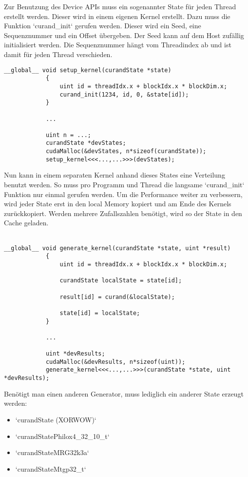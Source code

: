 			Zur Benutzung des Device \Glspl{API} muss ein sogenannter State für jeden \Gls{Thread} erstellt werden. Dieser wird in einem eigenen \Gls{Kernel} erstellt.
			Dazu muss die Funktion \li`curand_init` gerufen werden. Dieser wird ein Seed, eine Sequenznummer und ein Offset übergeben. Der Seed kann auf dem Host zufällig initialisiert werden. Die Sequenznummer hängt vom \Gls{Thread}index ab und ist damit für jeden \Gls{Thread} verschieden.
			\begin{lstlisting}[caption=cuRAND: Device API States]
			__global__ void setup_kernel(curandState *state)
			{
				uint id = threadIdx.x + blockIdx.x * blockDim.x;
				curand_init(1234, id, 0, &state[id]);
			}
			
			...
			
			uint n = ...;
			curandState *devStates;
			cudaMalloc(&devStates, n*sizeof(curandState));
			setup_kernel<<<...,...>>>(devStates);		
			\end{lstlisting}
			
			Nun kann in einem separaten \Gls{Kernel} anhand dieses States eine Verteilung benutzt werden. So muss pro Programm und \Gls{Thread} die langsame \li`curand_init` Funktion nur einmal gerufen werden. Um die Performance weiter zu verbessern, wird jeder State erst in den \gls{local Memory} kopiert und am Ende des \Glspl{Kernel} zurückkopiert. Werden mehrere Zufallszahlen benötigt, wird so der State in den Cache geladen.  \\ \\
			\begin{lstlisting}[caption=cuRAND: Device API Generierung]
			__global__ void generate_kernel(curandState *state, uint *result)
			{
				uint id = threadIdx.x + blockIdx.x * blockDim.x;

				curandState localState = state[id];

				result[id] = curand(&localState);
				
				state[id] = localState;
			}
			
			...
			
			uint *devResults;
			cudaMalloc(&devResults, n*sizeof(uint));
			generate_kernel<<<...,...>>>(curandState *state, uint *devResults);
			\end{lstlisting}
			
			Benötigt man einen anderen Generator, muss lediglich ein anderer State erzeugt werden:
			\begin{itemize}
			\item \li`curandState (XORWOW)`
			\item \li`curandStatePhilox4_32_10_t`
			\item \li`curandStateMRG32k3a`
			\item \li`curandStateMtgp32_t`
			\end{itemize}
			
